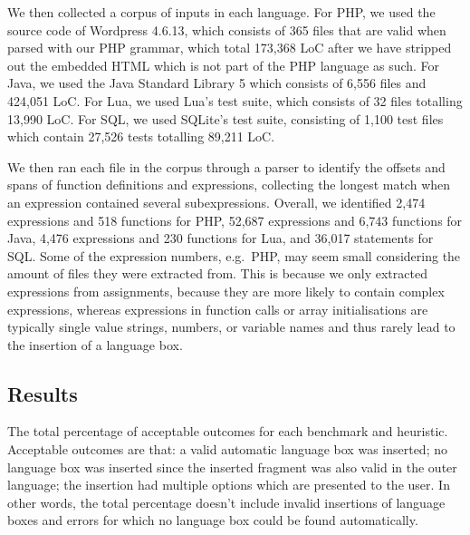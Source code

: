 \documentclass[sigplan,screen]{acmart}\settopmatter{printfolios=true,printccs=false,printacmref=false}
\begin{document}
We then collected a corpus of inputs in each language.
For PHP, we used the source code of Wordpress 4.6.13, which consists of 365 files that are
valid when parsed with our PHP grammar, which total 173,368 LoC after we
have stripped out the embedded HTML which is not part of the PHP
language as such. For Java, we used the Java Standard Library 5 which consists
of 6,556 files and 424,051 LoC.
For Lua, we used Lua's test suite, which consists of 32 files totalling 13,990 LoC.
For SQL, we used SQLite's test suite, consisting of 1,100 test files which
contain 27,526 tests totalling 89,211 LoC.

We then ran each file in the corpus through a parser to identify the offsets and spans
of function definitions and expressions, collecting the longest match when an
expression contained several subexpressions. Overall, we identified 2,474
expressions and 518 functions for PHP, 52,687 expressions and 6,743 functions for
Java, 4,476 expressions and 230 functions for Lua, and 36,017 statements for SQL.
Some of the expression numbers, e.g.~PHP, may seem small considering the amount
of files they were extracted from. This is because we only extracted
expressions from assignments, because they are more likely to contain complex
expressions, whereas expressions in function calls or array initialisations are
typically single value strings, numbers, or variable names and thus rarely lead
to the insertion of a language box.


\subsection{Results}

\begin{table}[tb]
    

    \vspace{7pt}
    \caption{The total percentage of acceptable outcomes for each benchmark and
    heuristic. Acceptable outcomes are that: a valid automatic language box
    was inserted; no language box was inserted since the inserted fragment
    was also valid in the outer language; the insertion had multiple options
    which are presented to the user. In other words, the total percentage
    doesn't include invalid insertions of language boxes and errors for which
    no language box could be found automatically.}
    \label{tbl:valid}
\end{table}
\end{document}
